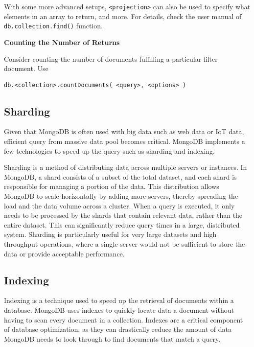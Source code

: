 With some more advanced setups, \verb|<projection>| can also be used to specify what elements in an array to return, and more. For details, check the user manual of \verb|db.collection.find()| function.

\vspace{0.1in}
\noindent \textbf{Counting the Number of Returns}
\vspace{0.1in}

Consider counting the number of documents fulfilling a particular filter document. Use
\begin{lstlisting}
db.<collection>.countDocuments( <query>, <options> )
\end{lstlisting}

\subsection{Sharding}

Given that MongoDB is often used with big data such as web data or IoT data, efficient query from massive data pool becomes critical. MongoDB implements a few technologies to speed up the query such as sharding and indexing.

Sharding is a method of distributing data across multiple servers or instances. In MongoDB, a shard consists of a subset of the total dataset, and each shard is responsible for managing a portion of the data. This distribution allows MongoDB to scale horizontally by adding more servers, thereby spreading the load and the data volume across a cluster. When a query is executed, it only needs to be processed by the shards that contain relevant data, rather than the entire dataset. This can significantly reduce query times in a large, distributed system. Sharding is particularly useful for very large datasets and high throughput operations, where a single server would not be sufficient to store the data or provide acceptable performance.

\subsection{Indexing}

Indexing is a technique used to speed up the retrieval of documents within a database. MongoDB uses indexes to quickly locate data a document without having to scan every document in a collection. Indexes are a critical component of database optimization, as they can drastically reduce the amount of data MongoDB needs to look through to find documents that match a query. 

